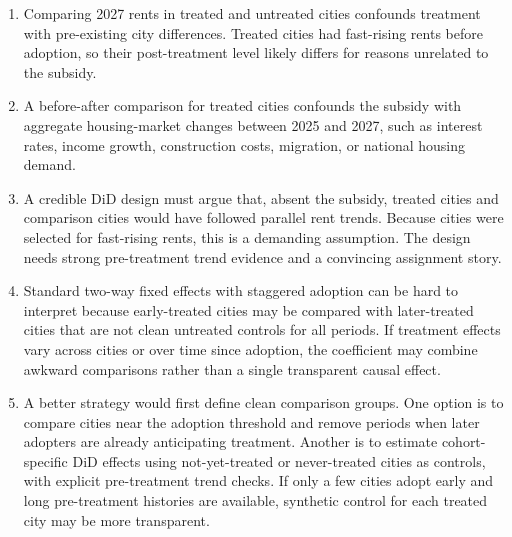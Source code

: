 \documentclass[11pt]{article}
\begin{document}
\begin{solutionbox}
\begin{enumerate}[label=(\alph*)]
\item Comparing 2027 rents in treated and untreated cities confounds treatment with pre-existing city differences. Treated cities had fast-rising rents before adoption, so their post-treatment level likely differs for reasons unrelated to the subsidy.

\item A before-after comparison for treated cities confounds the subsidy with aggregate housing-market changes between 2025 and 2027, such as interest rates, income growth, construction costs, migration, or national housing demand.

\item A credible DiD design must argue that, absent the subsidy, treated cities and comparison cities would have followed parallel rent trends. Because cities were selected for fast-rising rents, this is a demanding assumption. The design needs strong pre-treatment trend evidence and a convincing assignment story.

\item Standard two-way fixed effects with staggered adoption can be hard to interpret because early-treated cities may be compared with later-treated cities that are not clean untreated controls for all periods. If treatment effects vary across cities or over time since adoption, the coefficient may combine awkward comparisons rather than a single transparent causal effect.

\item A better strategy would first define clean comparison groups. One option is to compare cities near the adoption threshold and remove periods when later adopters are already anticipating treatment. Another is to estimate cohort-specific DiD effects using not-yet-treated or never-treated cities as controls, with explicit pre-treatment trend checks. If only a few cities adopt early and long pre-treatment histories are available, synthetic control for each treated city may be more transparent.
\end{enumerate}
\end{solutionbox}
\end{document}
